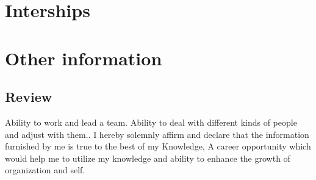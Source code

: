 \documentclass[letterpaper]{twentysecondcv} %
\begin{document}

\section{Interships}

\begin{twentyshort} %
\end{twentyshort}


\section{Other information}

\subsection{Review}

Ability to work and lead a team. Ability to deal with different kinds of
people and adjust with them.. I hereby solemnly affirm and declare that
the information furnished by me is true to the best of my Knowledge, A
career opportunity which would help me to utilize my knowledge and
ability to enhance the growth of organization and self.





\end{document}
